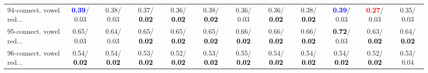 \begin{table}[h]
\begin{center}
{\begin{tabular}{lc|c|c|c|c|c|c|c|c|c|c}
94-connect. vowel red... & \textcolor{blue}{\textbf{  0.39}}/  0.03 &   0.38/  0.03 &   0.37/\textcolor{black}{\textbf{  0.02}} &   0.36/\textcolor{black}{\textbf{  0.02}} &   0.38/\textcolor{black}{\textbf{  0.02}} &   0.36/  0.03 &   0.36/\textcolor{black}{\textbf{  0.02}} &   0.38/\textcolor{black}{\textbf{  0.02}} & \textcolor{blue}{\textbf{  0.39}}/  0.03 & \textcolor{red}{\textbf{  0.27}}/  0.03 &   0.35/  0.03 \\
95-connect. vowel red... &   0.65/  0.03 &   0.64/  0.03 &   0.65/\textcolor{black}{\textbf{  0.02}} &   0.65/\textcolor{black}{\textbf{  0.02}} &   0.65/\textcolor{black}{\textbf{  0.02}} &   0.66/\textcolor{black}{\textbf{  0.02}} &   0.66/\textcolor{black}{\textbf{  0.02}} &   0.66/\textcolor{black}{\textbf{  0.02}} & \textcolor{black}{\textbf{  0.72}}/  0.03 &   0.63/\textcolor{black}{\textbf{  0.02}} &   0.64/\textcolor{black}{\textbf{  0.02}} \\
96-connect. vowel red... &   0.54/\textcolor{black}{\textbf{  0.02}} &   0.54/\textcolor{black}{\textbf{  0.02}} &   0.53/\textcolor{black}{\textbf{  0.02}} &   0.52/\textcolor{black}{\textbf{  0.02}} &   0.53/\textcolor{black}{\textbf{  0.02}} &   0.55/\textcolor{black}{\textbf{  0.02}} &   0.54/\textcolor{black}{\textbf{  0.02}} &   0.54/\textcolor{black}{\textbf{  0.02}} &   0.54/\textcolor{black}{\textbf{  0.02}} &   0.52/\textcolor{black}{\textbf{  0.02}} &   0.53/  0.04 \\\end{tabular}}\label{stratsALCKappa2Allalla}
\end{center}
\end{table}

